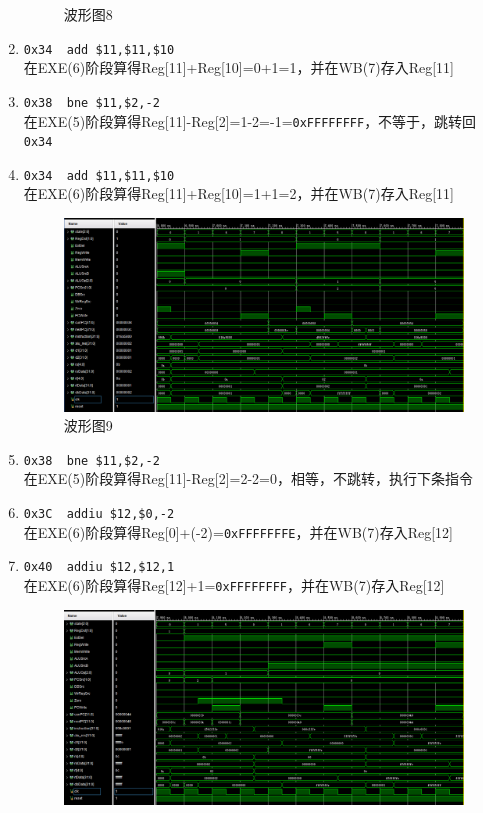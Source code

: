 \begin{enumerate}
\begin{figure}[H]
\caption{波形图8}
\label{fig:wave_8}
\end{figure}
    \item \verb'0x34  add $11,$11,$10'\\
    在EXE(6)阶段算得Reg[11]+Reg[10]=0+1=1，并在WB(7)存入Reg[11]
    \item \verb'0x38  bne $11,$2,-2'\\
    在EXE(5)阶段算得Reg[11]-Reg[2]=1-2=-1=\verb'0xFFFFFFFF'，不等于，跳转回\verb'0x34'
    \item \verb'0x34  add $11,$11,$10'\\
    在EXE(6)阶段算得Reg[11]+Reg[10]=1+1=2，并在WB(7)存入Reg[11]
\begin{figure}[H]
\centering
\includegraphics[width=\linewidth]{fig/FullIns/Ins9.PNG}
\caption{波形图9}
\label{fig:wave_9}
\end{figure}
    \item \verb'0x38  bne $11,$2,-2'\\
    在EXE(5)阶段算得Reg[11]-Reg[2]=2-2=0，相等，不跳转，执行下条指令
    \item \verb'0x3C  addiu $12,$0,-2'\\
    在EXE(6)阶段算得Reg[0]+(-2)=\verb'0xFFFFFFFE'，并在WB(7)存入Reg[12]
    \item \verb'0x40  addiu $12,$12,1'\\
    在EXE(6)阶段算得Reg[12]+1=\verb'0xFFFFFFFF'，并在WB(7)存入Reg[12]
\begin{figure}[H]
\centering
\includegraphics[width=\linewidth]{fig/FullIns/Ins10.PNG}

\end{figure}
\end{enumerate}
